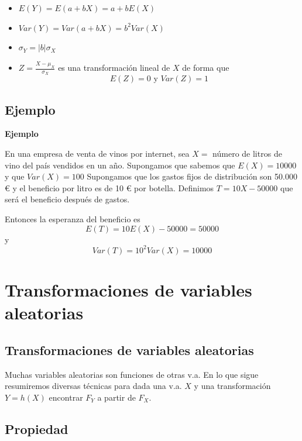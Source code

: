 \documentclass[]{book}
\providecommand{\tightlist}{%
  \setlength{\itemsep}{0pt}\setlength{\parskip}{0pt}}
\begin{document}
\begin{itemize}
\tightlist
\item
  \(E(Y)=E(a+b X)=a+b E(X)\)
\item
  \(Var(Y)=Var(a+b X)=b^2 Var(X)\)
\item
  \(\sigma_{Y}=|b| \sigma_{X}\)
\item
  \(Z=\frac{X-\mu_{X}}{\sigma_{X}}\) es una transformación
  lineal de \(X\) de forma que
  \[E(Z)=0 \mbox{ y } Var(Z)=1\]
\end{itemize}

\hypertarget{ejemplo-22}{%
\subsection{Ejemplo}\label{ejemplo-22}}

\textbf{Ejemplo}

En una empresa de venta de vinos por internet, sea
\(X=\) número de litros de vino del país vendidos en un año.
Supongamos que sabemos que \(E(X)=10000\) y que \(Var(X)=100\)
Supongamos que los gastos fijos de distribución son
50.000 € y el beneficio por litro es de 10 € por botella.
Definimos \(T=10 X-50000\) que será el beneficio después de gastos.

Entonces la esperanza del beneficio es
\[E(T)=10 E(X)-50000 = 50000\]
y
\[Var(T)=10^2 Var(X)= 10000\]

\hypertarget{transformaciones-de-variables-aleatorias}{%
\section{Transformaciones de variables aleatorias}\label{transformaciones-de-variables-aleatorias}}

\hypertarget{transformaciones-de-variables-aleatorias-1}{%
\subsection{Transformaciones de variables aleatorias}\label{transformaciones-de-variables-aleatorias-1}}

Muchas variables aleatorias son funciones de otras v.a. En lo que sigue resumiremos diversas técnicas para dada una v.a. \(X\) y una
transformación \(Y=h(X)\) encontrar \(F_{Y}\) a
partir de \(F_{X}\).

\hypertarget{propiedad}{%
\subsection{Propiedad}\label{propiedad}}
\end{document}
